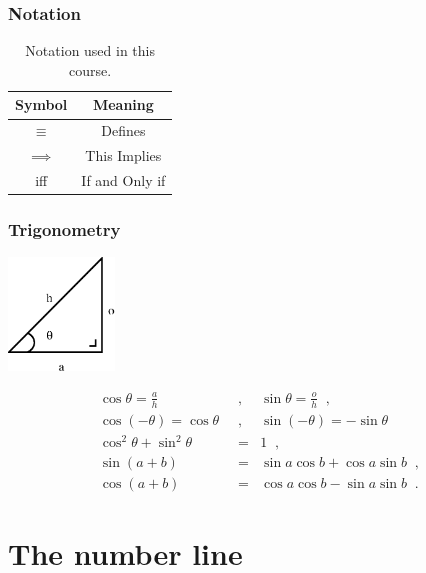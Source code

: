 \documentclass[hyperref={colorlinks=true},xcolor=svgnames]{beamer}
\begin{document}
\begin{frame}
\frametitle{Notation}

\begin{table}[htdp]

\begin{center}
\begin{tabular}{|c|c|}
\hline 
Symbol & Meaning  \\ \hline
$\equiv$ & Defines \\
$\implies$ & This Implies \\
iff & If and Only if \\ \hline 
\end{tabular}
\end{center}
\caption{Notation used in this course.}
\label{Notation}
\end{table}%


\end{frame} 

\begin{frame}
\frametitle{Trigonometry}


\begin{center}
\includegraphics[height=3cm]{../Figures/Topic1_preamble.png}
\end{center}

\begin{eqnarray}
\cos{\theta} = \frac{a}{h} \;\; &, &
\sin{\theta} = \frac{o}{h} \;\; , \\
\cos{(-\theta)} = \cos \theta \;\; &,&
\sin{(-\theta)} = -\sin \theta \;\; \\
\cos^2{\theta} + \sin^2{\theta} &=& 1 \;\; , \\
\sin{(a+b)} &=& \sin{a} \cos{b} + \cos{a}\sin{b} \;\; , \\
\cos{(a+b)} &=& \cos{a} \cos{b} - \sin{a} \sin{b} \;\; .   
\end{eqnarray}




\end{frame}

\section{The number line}
\end{document}
